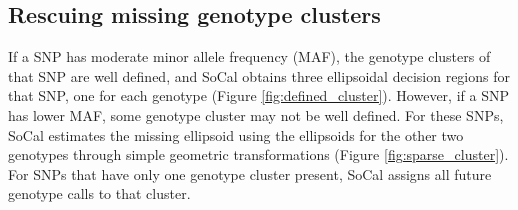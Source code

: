 \documentclass{scrartcl}
\begin{document}
\subsection{Rescuing missing genotype clusters}

\par
If a SNP has moderate minor allele frequency (MAF), the genotype clusters of
that SNP are well defined, and SoCal obtains three ellipsoidal decision
regions for that SNP, one for each genotype (Figure \ref{fig:defined_cluster}).
However, if a SNP has lower MAF, some genotype cluster may not be well defined.
For these SNPs, SoCal estimates the missing ellipsoid using the ellipsoids for
the other two genotypes through simple geometric transformations
(Figure \ref{fig:sparse_cluster}).
For SNPs that have only one genotype cluster present, SoCal assigns all future
genotype calls to that cluster.
\end{document}
